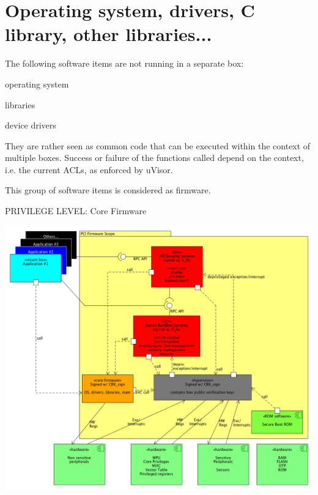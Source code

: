 \hypertarget{group__os}{}\section{Operating system, drivers, C library, other libraries...}
\label{group__os}
The following software items are not running in a separate box\+:


\begin{DoxyItemize}
\item operating system
\item libraries
\item device drivers
\end{DoxyItemize}

They are rather seen as common code that can be executed within the context of multiple boxes. Success or failure of the functions called depend on the context, i.\+e. the current A\+C\+Ls, as enforced by u\+Visor.

This group of software items is considered as firmware.

P\+R\+I\+V\+I\+L\+E\+GE L\+E\+V\+EL\+: Core Firmware
\begin{DoxyImageNoCaption}
  \mbox{\includegraphics[width=\textwidth, height=\textheight/2, keepaspectratio=true]{pci_cortex.png}}
\end{DoxyImageNoCaption}
  